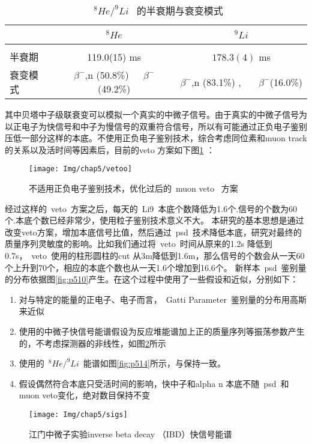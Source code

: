 \begin{table}[htbp]
\centering  %
\begin{tabular}{lcc}  %
\hline
&~$^{8}He$~&~$^{9}Li$~ \\ \hline  %
\\ 半衰期&119.0(15) ms& $178.3(4)$ ms       %
\\ 衰变模式&$\beta^{-}$,n (50.8\%)~~~$\beta^{-}$(49.2\%) & $\beta^{-}$,n (83.1\%) , ~~~$\beta^{-}$(16.0\%)   %
\\ \hline
\end{tabular}
\caption{~$^{8}He/^{9}Li$~ 的半衰期与衰变模式}
\end{table}
其中贝塔中子级联衰变可以模拟一个真实的中微子信号。由于真实的中微子信号为以正电子为快信号和中子为慢信号的双重符合信号，所以有可能通过正负电子鉴别压低一部分这样的本底。不使用正负电子鉴别技术，综合考虑同位素和muon track 的关系以及活时间等因素后，目前的veto 方案如下图\ref{fig:p512} ：
\begin{figure}[!htbp]
  \centering
   \texttt{[image: Img/chap5/vetoo]}
    \caption{不适用正负电子鉴别技术，优化过后的~muon veto ~方案}
  \label{fig:p512}
\end{figure}

经过这样的~veto~方案之后，每天的~Li9~本底个数降低为1.6个.信号的个数为60个.本底个数已经非常少，使用粒子鉴别技术意义不大。
本研究的基本思想是通过改变veto方案，增加本底信号比值，然后通过~psd~技术降低本底，研究对最终的质量序列灵敏度的影响。比如我们通过将~veto~时间从原来的1.2s 降低到0.7s，~veto~使用的柱形圆柱的cut 从3m降低到1.6m，那么信号的个数会从一天60个上升到70个，相应的本底个数也从一天1.6个增加到16.6个。
新样本~psd~鉴别量的分布依据图\ref{fig:p510}产生。在这个过程中使用了一些假设和近似，分别如下：
\begin{enumerate}
\item 对与特定的能量的正电子、电子而言，~Gatti Parameter~鉴别量的分布用高斯来近似
\item 使用的中微子快信号能谱假设为反应堆能谱加上正的质量序列等振荡参数产生的，不考虑探测器的非线性，如图\ref{fig:p513}所示
\item 使用的~$^{8}He/^{9}Li$~能谱如图\ref{fig:p514}所示，与\citep{an2015neutrino}保持一致。
\item 假设偶然符合本底只受活时间的影响，快中子和alpha n 本底不随~psd~和muon veto变化，绝对数目保持不变
\end{enumerate}
\begin{figure}[!htbp]
  \centering
   \texttt{[image: Img/chap5/sigs]}
    \caption{江门中微子实验inverse beta decay （IBD）快信号能谱}
  \label{fig:p513}
\end{figure}

